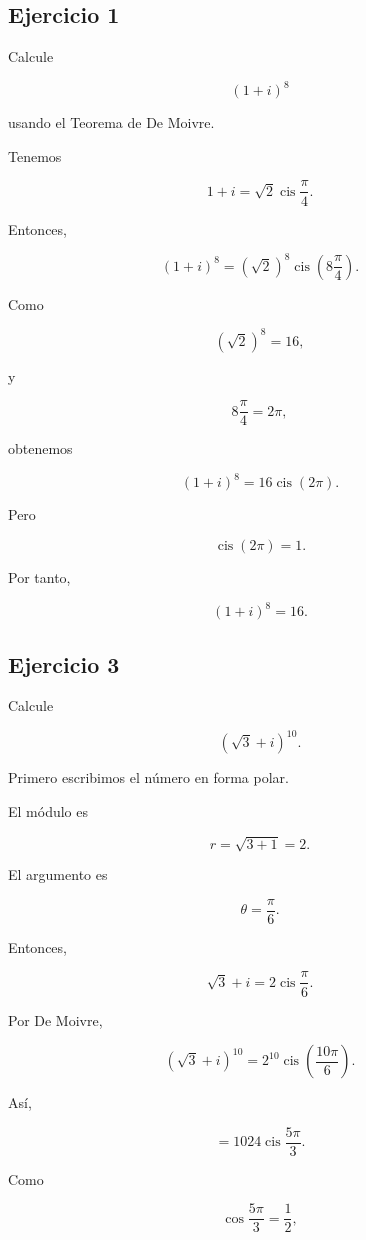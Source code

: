 \documentclass[12pt]{article}
\begin{document}
\subsection*{Ejercicio 1}

Calcule

\[
(1+i)^8
\]

usando el Teorema de De Moivre.

Tenemos

\[
1+i
=
\sqrt2\operatorname{cis}\frac{\pi}{4}.
\]

Entonces,

\[
(1+i)^8
=
(\sqrt2)^8
\operatorname{cis}
\left(
8\frac{\pi}{4}
\right).
\]

Como

\[
(\sqrt2)^8=16,
\]

y

\[
8\frac{\pi}{4}=2\pi,
\]

obtenemos

\[
(1+i)^8
=
16\operatorname{cis}(2\pi).
\]

Pero

\[
\operatorname{cis}(2\pi)=1.
\]

Por tanto,

\[
\boxed{(1+i)^8=16}.
\]


\subsection*{Ejercicio 3}

Calcule

\[
(\sqrt3+i)^{10}.
\]

Primero escribimos el número en forma polar.

El módulo es

\[
r
=
\sqrt{3+1}
=
2.
\]

El argumento es

\[
\theta=\frac{\pi}{6}.
\]

Entonces,

\[
\sqrt3+i
=
2\operatorname{cis}\frac{\pi}{6}.
\]

Por De Moivre,

\[
(\sqrt3+i)^{10}
=
2^{10}
\operatorname{cis}
\left(
\frac{10\pi}{6}
\right).
\]

Así,

\[
=
1024
\operatorname{cis}
\frac{5\pi}{3}.
\]

Como

\[
\cos\frac{5\pi}{3}
=
\frac12,
\]
\end{document}
